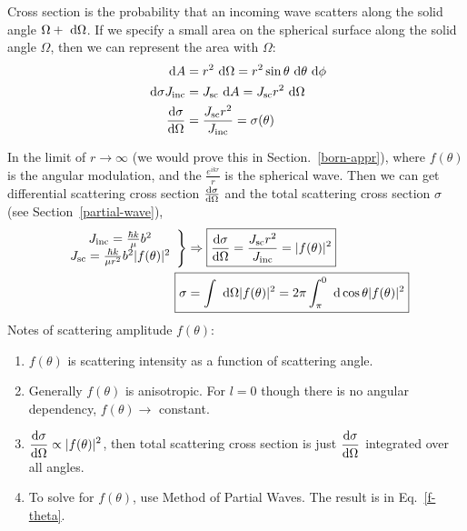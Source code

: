 \documentclass{school-22.101-notes}
\begin{document}
Cross section is the probability that an incoming wave scatters along the solid angle $\Omega+\mbox{ }\mathrm{d} \Omega$. If we specify a small area on the spherical surface along the solid angle $\Omega$, then we can represent the area with $\Omega$:
\begin{align}
\mbox{ }\mathrm{d} A &= r^2 \mbox{ }\mathrm{d} \Omega = r^2 \sin \theta \mbox{ }\mathrm{d} \theta \mbox{ }\mathrm{d} \phi \\
\mbox{ }\mathrm{d} \sigma J_{\mathrm{inc}} &= J_{\mathrm{sc}} \mbox{ }\mathrm{d} A = J_{\mathrm{sc}} r^2 \mbox{ }\mathrm{d} \Omega \\
\frac{\mathrm{d}\sigma}{\mathrm{d}\Omega} &= \frac{J_{\mathrm{sc}} r^2}{J_{\mathrm{inc}}} = \sigma(\theta) 
\end{align}

In the limit of $r \to \infty$ (we would prove this in Section.~\ref{born-appr}), 
where $f(\theta)$ is the angular modulation, and the $\frac{e^{ikr}}{r}$ is the spherical wave. 
Then we can get differential scattering cross section $\frac{\mathrm{d}\sigma}{\mathrm{d}\Omega}$ and the total scattering cross section $\sigma$ (see Section~\ref{partial-wave}), 
\begin{align}
\left. \begin{array}{c}
J_{\mathrm{inc}} = \frac{\hbar k}{\mu} b^2  \\
J_{\mathrm{sc}} = \frac{\hbar k}{\mu r^2} b^2 |f(\theta)|^2 \\
\end{array} \right\} & \Rightarrow \boxed{\dsigmadOmega =  \frac{J_{\mathrm{sc}} r^2}{ J_{\mathrm{inc}}} = |f(\theta)|^2 }  \\
\Aboxed{ \sigma &= \int \dOmega |f(\theta)|^2  = 2 \pi \int_{\pi}^0 \derivative \cos \theta |f(\theta)|^2 }
\end{align}
Notes of scattering amplitude $f(\theta)$: 
\begin{enumerate}
\item $f(\theta)$ is scattering intensity as a function of scattering angle.
\item Generally $f(\theta)$ is anisotropic. For $l=0$ though there is no angular dependency, $f(\theta) \to $ constant. 
\item $\displaystyle \frac{\mathrm{d}\sigma}{\mathrm{d}\Omega} \propto |f(\theta)|^2 $, then total scattering cross section is just $\displaystyle \frac{\mathrm{d}\sigma}{\mathrm{d}\Omega}$ integrated over all angles.  
\item To solve for $f(\theta)$, use Method of Partial Waves. The result is in Eq.~\ref{f-theta}. 
\end{enumerate}
\end{document}
